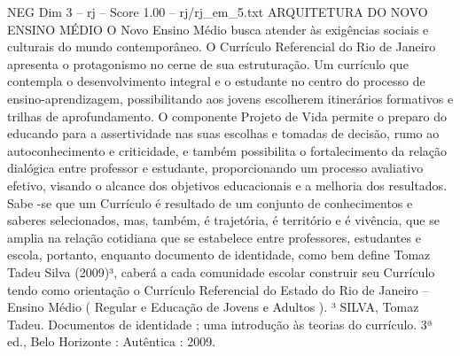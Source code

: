 \begin{textsample}{NEG Dim 3 – rj – Score 1.00 – rj/rj\_em\_5.txt}  \label{ex:f3_neg_276}
ARQUITETURA DO NOVO ENSINO MÉDIO O Novo Ensino Médio busca atender às exigências sociais e culturais do mundo contemporâneo.
O Currículo Referencial do Rio de Janeiro apresenta o protagonismo no cerne de sua estruturação.
Um currículo que contempla o desenvolvimento integral e o estudante no centro do processo de ensino-aprendizagem, possibilitando aos jovens escolherem itinerários formativos e trilhas de aprofundamento.
O componente Projeto de Vida permite o preparo do educando para a assertividade nas suas escolhas e tomadas de decisão, rumo ao autoconhecimento e criticidade, e também possibilita o fortalecimento da relação dialógica entre professor e estudante, proporcionando um processo avaliativo efetivo, visando o alcance dos objetivos educacionais e a melhoria dos resultados.
Sabe -se que um Currículo é resultado de um conjunto de conhecimentos e saberes selecionados, mas, também, é trajetória, é território e é vivência, que se amplia na relação cotidiana que se estabelece entre professores, estudantes e escola, portanto, enquanto documento de identidade, como bem define Tomaz Tadeu Silva (2009)³, caberá a cada comunidade escolar construir seu Currículo tendo como orientação o Currículo Referencial do Estado do Rio de Janeiro – Ensino Médio ( Regular e Educação de Jovens e Adultos ). ³ SILVA, Tomaz Tadeu.
Documentos de identidade ; uma introdução às teorias do currículo. 3ª ed., Belo Horizonte : Autêntica : 2009.

\end{textsample}
